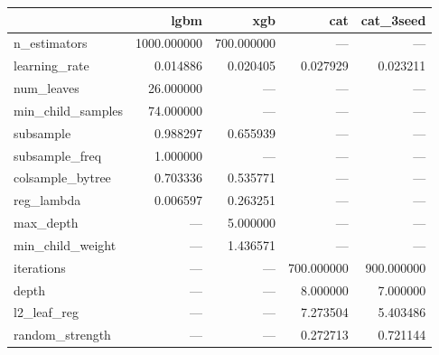 \begin{tabular}{lrrrr}
\toprule
 & lgbm & xgb & cat & cat_3seed \\
\midrule
n_estimators & 1000.000000 & 700.000000 & — & — \\
learning_rate & 0.014886 & 0.020405 & 0.027929 & 0.023211 \\
num_leaves & 26.000000 & — & — & — \\
min_child_samples & 74.000000 & — & — & — \\
subsample & 0.988297 & 0.655939 & — & — \\
subsample_freq & 1.000000 & — & — & — \\
colsample_bytree & 0.703336 & 0.535771 & — & — \\
reg_lambda & 0.006597 & 0.263251 & — & — \\
max_depth & — & 5.000000 & — & — \\
min_child_weight & — & 1.436571 & — & — \\
iterations & — & — & 700.000000 & 900.000000 \\
depth & — & — & 8.000000 & 7.000000 \\
l2_leaf_reg & — & — & 7.273504 & 5.403486 \\
random_strength & — & — & 0.272713 & 0.721144 \\
\bottomrule
\end{tabular}
